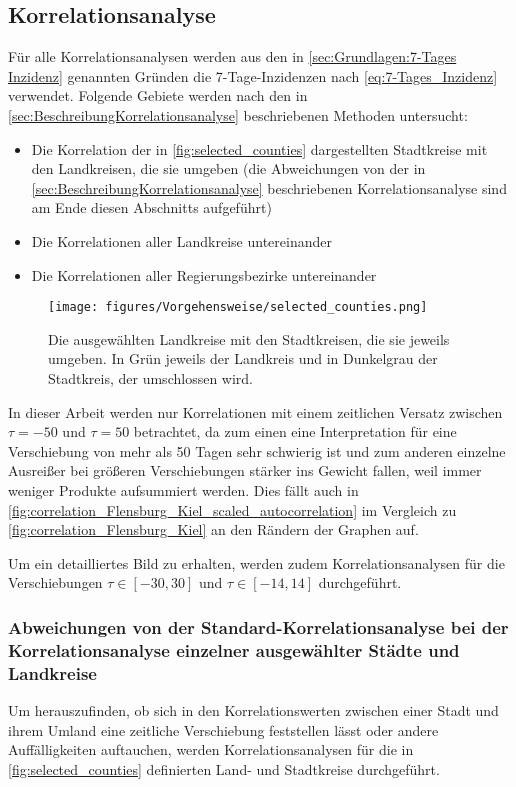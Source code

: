 \subsection{Korrelationsanalyse}
Für alle Korrelationsanalysen werden aus den in \autoref{sec:Grundlagen:7-Tages Inzidenz} genannten Gründen die 7-Tage-Inzidenzen nach \autoref{eq:7-Tages_Inzidenz} verwendet. Folgende Gebiete werden nach den in \autoref{sec:BeschreibungKorrelationsanalyse} beschriebenen Methoden untersucht:
\begin{itemize}
    \item Die Korrelation der in \autoref{fig:selected_counties} dargestellten Stadtkreise mit den Landkreisen, die sie umgeben (die Abweichungen von der in \autoref{sec:BeschreibungKorrelationsanalyse} beschriebenen Korrelationsanalyse sind am Ende diesen Abschnitts aufgeführt)
    \item Die Korrelationen aller Landkreise untereinander
    \item Die Korrelationen aller Regierungsbezirke untereinander
\end{itemize}

\begin{figure}[H]
    \centering
    \texttt{[image: figures/Vorgehensweise/selected\_counties.png]}
    \caption{Die ausgewählten Landkreise mit den Stadtkreisen, die sie jeweils umgeben. In Grün jeweils der Landkreis und in Dunkelgrau der Stadtkreis, der umschlossen wird.}
    \label{fig:selected_counties}
\end{figure}
In dieser Arbeit werden nur Korrelationen mit einem zeitlichen Versatz zwischen $\tau=-50$ und $\tau=50$ betrachtet, da zum einen eine Interpretation für eine Verschiebung von mehr als 50 Tagen sehr schwierig ist und zum anderen einzelne Ausreißer bei größeren Verschiebungen stärker ins Gewicht fallen, weil immer weniger Produkte aufsummiert werden. Dies fällt auch in \autoref{fig:correlation_Flensburg_Kiel_scaled_autocorrelation} im Vergleich zu \autoref{fig:correlation_Flensburg_Kiel} an den Rändern der Graphen auf.

Um ein detailliertes Bild zu erhalten, werden zudem Korrelationsanalysen für die Verschiebungen $\tau\in[-30,30]$ und $\tau\in[-14,14]$ durchgeführt.

\subsubsection{Abweichungen von der Standard-Korrelationsanalyse bei der Korrelationsanalyse einzelner ausgewählter Städte und Landkreise}\label{sec:selected_counties}
Um herauszufinden, ob sich in den Korrelationswerten zwischen einer Stadt und ihrem Umland eine zeitliche Verschiebung feststellen lässt oder andere Auffälligkeiten auftauchen, werden Korrelationsanalysen für die in \autoref{fig:selected_counties} definierten Land- und Stadtkreise durchgeführt.

